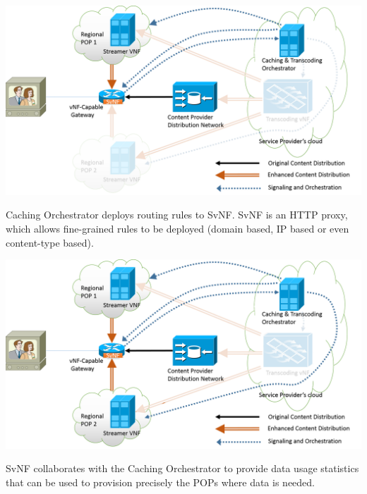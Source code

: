 \documentclass[a4paper]{beamer}
\begin{document}
\begin{frame}{}
	\centering
	\includegraphics[width=0.95\linewidth]{highleveldesign4.png}
	\vspace{1em}
	\begin{block}{}
		Caching Orchestrator deploys routing rules to SvNF. SvNF is an HTTP proxy, which allows fine-grained rules to be deployed (domain based, IP based or even content-type based).
	\end{block}
\end{frame}


\begin{frame}{}
	\centering
	\includegraphics[width=0.95\linewidth]{highleveldesign5.png}
		\vspace{1em}
	\begin{block}{}
		SvNF collaborates with the Caching Orchestrator to provide data usage statistics that can be used to provision precisely the POPs where data is needed.
	\end{block}

\end{frame}
\end{document}
